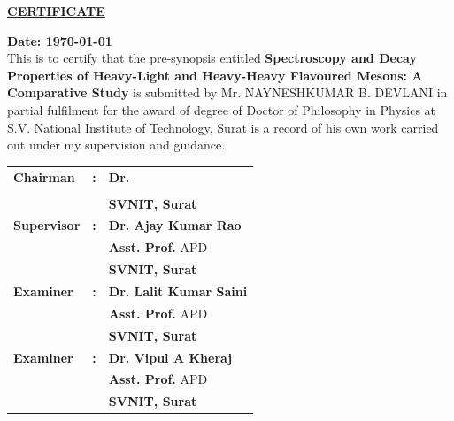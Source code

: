 \documentclass[draft,11pt]{scrreprt}
\begin{document}
\hrulefill



\begin{center}
\large\textbf{\underline{CERTIFICATE}}
\end{center} 
\vspace*{10pt}
\hfill \textbf{Date: \today}\\[15pt]


 This is to certify that the pre-synopsis entitled \textbf{Spectroscopy and Decay Properties of Heavy-Light and Heavy-Heavy Flavoured Mesons: A Comparative Study}  is submitted by Mr.
NAYNESHKUMAR B. DEVLANI in partial fulfilment for the award of degree of Doctor of Philosophy in Physics at S.V. National Institute of Technology, Surat is a record of his own work carried out under my supervision and guidance.

\vspace*{25pt}
\begin{flushright}
\begin{tabular}{lll}
\textbf{Chairman} & \textbf{:} & \textbf{Dr. }\\
& & \textbf{} \\
& & \textbf{SVNIT, Surat}\\
\addlinespace
\addlinespace
\addlinespace
\addlinespace
\addlinespace
\textbf{Supervisor} & \textbf{:} & \textbf{Dr. Ajay Kumar Rao}\\
& & \textbf{Asst. Prof.} APD\\
& & \textbf{SVNIT, Surat}\\
\addlinespace
\addlinespace
\addlinespace
\addlinespace
\addlinespace
\textbf{Examiner} & \textbf{:} & \textbf{Dr. Lalit Kumar Saini}\\
& & \textbf{Asst. Prof.} APD\\
& & \textbf{SVNIT, Surat}\\
\addlinespace
\addlinespace
\addlinespace
\addlinespace
\addlinespace
\textbf{Examiner} & \textbf{:} & \textbf{Dr. Vipul A Kheraj}\\
& & \textbf{Asst. Prof.} APD\\
& & \textbf{SVNIT, Surat}




\end{tabular}
\end{flushright}

\pagestyle{empty} %
\tableofcontents %
\cleardoublepage %
\pagestyle{plain} %
\setcounter{page}{1} %
\end{document}
